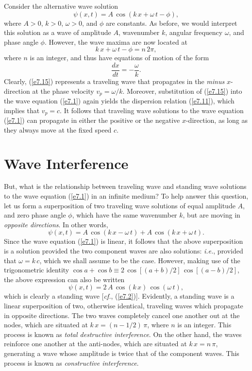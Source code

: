 Consider the  alternative wave solution
\begin{equation}\label{e7.15}
\psi(x,t) = A\,\cos(k\,x+\omega\,t-\phi),
\end{equation}
where $A>0$, $k>0$, $\omega>0$, and $\phi$ are constants. As before, we would interpret
this solution as a wave of amplitude $A$, wavenumber $k$, angular frequency $\omega$,
and phase angle $\phi$. 
However, the wave maxima are now located at
\begin{equation}
k\,x + \omega\,t-\phi = n\,2\pi,
\end{equation}
where $n$ is an integer, and thus have equations of motion of the form
\begin{equation}
\frac{dx}{dt} =-\frac{ \omega}{k}.
\end{equation}
Clearly,  (\ref{e7.15}) represents  a traveling wave that propagates in the {\em minus}\/
$x$-direction at the  phase velocity $v_p = \omega/k$.
Moreover, substitution of (\ref{e7.15}) into the wave equation (\ref{e7.1}) again
yields the dispersion relation (\ref{e7.11}), which implies that $v_p=c$. 
It follows that traveling wave solutions to
the wave equation (\ref{e7.1}) can propagate in either the positive or the negative $x$-direction, as long as they always move at the fixed speed $c$. 

\section{Wave Interference}\label{s7.3}
But, what is the relationship between traveling wave and standing
wave solutions to the wave equation (\ref{e7.1}) in an infinite medium? To help answer this question, let us form a superposition of two traveling wave solutions
of equal amplitude $A$, and zero phase angle $\phi$, which have the same wavenumber 
$k$,  but are moving in {\em opposite directions}. In other words,
\begin{equation}
\psi(x,t) = A\,\cos(k\,x-\omega\,t) + A\,\cos(k\,x+\omega\,t).
\end{equation}
Since the wave equation (\ref{e7.1}) is linear, it follows that the above superposition is a solution
provided the two component waves are also solutions: {\em i.e.}, provided that $\omega=k\,c$, which we shall assume to be the case. However, making
use of the trigonometric identity $\cos a + \cos b \equiv 2\,\cos[(a+b)/2]\,\cos[(a-b)/2]$,
the above expression can also be written
\begin{equation}
\psi(x,t) = 2\,A\,\cos(k\,x)\,\cos(\omega\,t),
\end{equation}
which is clearly a standing wave [{\em cf.}, (\ref{e7.2})].  Evidently, a standing wave is a linear
superposition of two, otherwise identical, traveling waves which propagate in opposite
directions. The two waves completely cancel one another out at the nodes, which
are situated at $k\,x=(n-1/2)\,\pi$, where $n$ is an integer. This process is known as
{\em total destructive interference}. On the other hand, the waves reinforce one another
at the anti-nodes, which are situated at $k\,x=n\,\pi$, generating a wave
whose amplitude is twice that of the component waves. This process
is known as {\em constructive interference}. 

